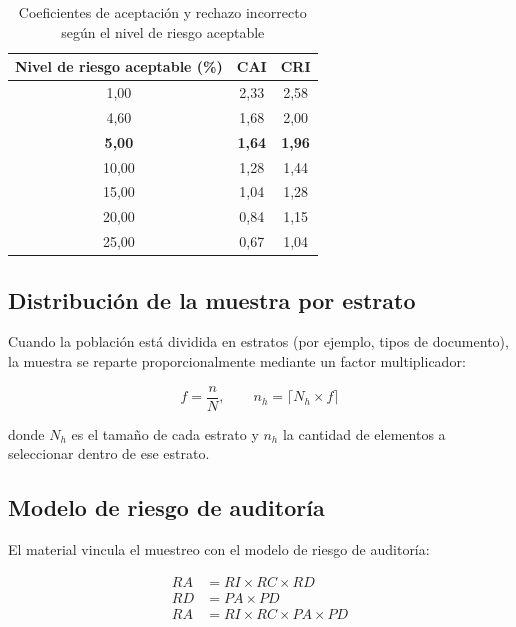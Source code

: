 \documentclass[12pt, a4paper]{article}
\theoremstyle{plain}
\theoremstyle{definition}
\theoremstyle{remark}
\begin{document}
\begin{table}[htbp]
    \centering
    \caption{Coeficientes de aceptación y rechazo incorrecto según el nivel
    de riesgo aceptable}
    \label{tab:riesgo}
    \begin{tabular}{@{}ccc@{}}
        \toprule
        Nivel de riesgo aceptable (\%) & CAI & CRI \\
        \midrule
        1{,}00  & 2{,}33 & 2{,}58 \\
        4{,}60  & 1{,}68 & 2{,}00 \\
        \textbf{5{,}00}  & \textbf{1{,}64} & \textbf{1{,}96} \\
        10{,}00 & 1{,}28 & 1{,}44 \\
        15{,}00 & 1{,}04 & 1{,}28 \\
        20{,}00 & 0{,}84 & 1{,}15 \\
        25{,}00 & 0{,}67 & 1{,}04 \\
        \bottomrule
    \end{tabular}
\end{table}

\subsection{Distribución de la muestra por estrato}

Cuando la población está dividida en estratos (por ejemplo, tipos de
documento), la muestra se reparte proporcionalmente mediante un factor
multiplicador:

\begin{equation}
    f = \frac{n}{N}, \qquad n_h = \lceil N_h \times f \rceil
\end{equation}

donde $N_h$ es el tamaño de cada estrato y $n_h$ la cantidad de elementos a
seleccionar dentro de ese estrato.

\subsection{Modelo de riesgo de auditoría}

El material vincula el muestreo con el modelo de riesgo de auditoría:

\begin{align}
    RA &= RI \times RC \times RD \\
    RD &= PA \times PD \\
    RA &= RI \times RC \times PA \times PD
\end{align}
\end{document}
